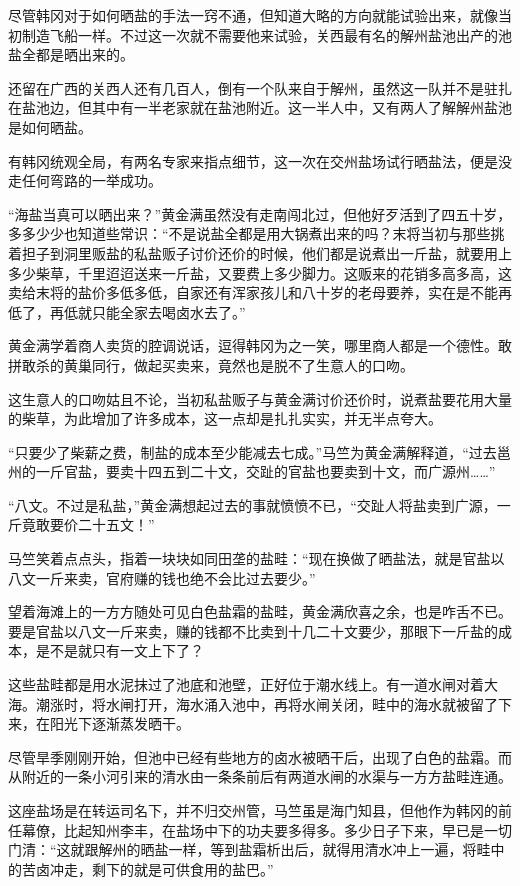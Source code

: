 尽管韩冈对于如何晒盐的手法一窍不通，但知道大略的方向就能试验出来，就像当初制造飞船一样。不过这一次就不需要他来试验，关西最有名的解州盐池出产的池盐全都是晒出来的。

还留在广西的关西人还有几百人，倒有一个队来自于解州，虽然这一队并不是驻扎在盐池边，但其中有一半老家就在盐池附近。这一半人中，又有两人了解解州盐池是如何晒盐。

有韩冈统观全局，有两名专家来指点细节，这一次在交州盐场试行晒盐法，便是没走任何弯路的一举成功。

“海盐当真可以晒出来？”黄金满虽然没有走南闯北过，但他好歹活到了四五十岁，多多少少也知道些常识：“不是说盐全都是用大锅煮出来的吗？末将当初与那些挑着担子到洞里贩盐的私盐贩子讨价还价的时候，他们都是说煮出一斤盐，就要用上多少柴草，千里迢迢送来一斤盐，又要费上多少脚力。这贩来的花销多高多高，这卖给末将的盐价多低多低，自家还有浑家孩儿和八十岁的老母要养，实在是不能再低了，再低就只能全家去喝卤水去了。”

黄金满学着商人卖货的腔调说话，逗得韩冈为之一笑，哪里商人都是一个德性。敢拼敢杀的黄巢同行，做起买卖来，竟然也是脱不了生意人的口吻。

这生意人的口吻姑且不论，当初私盐贩子与黄金满讨价还价时，说煮盐要花用大量的柴草，为此增加了许多成本，这一点却是扎扎实实，并无半点夸大。

“只要少了柴薪之费，制盐的成本至少能减去七成。”马竺为黄金满解释道，“过去邕州的一斤官盐，要卖十四五到二十文，交趾的官盐也要卖到十文，而广源州……”

“八文。不过是私盐，”黄金满想起过去的事就愤愤不已，“交趾人将盐卖到广源，一斤竟敢要价二十五文！”

马竺笑着点点头，指着一块块如同田垄的盐畦：“现在换做了晒盐法，就是官盐以八文一斤来卖，官府赚的钱也绝不会比过去要少。”

望着海滩上的一方方随处可见白色盐霜的盐畦，黄金满欣喜之余，也是咋舌不已。要是官盐以八文一斤来卖，赚的钱都不比卖到十几二十文要少，那眼下一斤盐的成本，是不是就只有一文上下了？

这些盐畦都是用水泥抹过了池底和池壁，正好位于潮水线上。有一道水闸对着大海。潮涨时，将水闸打开，海水涌入池中，再将水闸关闭，畦中的海水就被留了下来，在阳光下逐渐蒸发晒干。

尽管旱季刚刚开始，但池中已经有些地方的卤水被晒干后，出现了白色的盐霜。而从附近的一条小河引来的清水由一条条前后有两道水闸的水渠与一方方盐畦连通。

这座盐场是在转运司名下，并不归交州管，马竺虽是海门知县，但他作为韩冈的前任幕僚，比起知州李丰，在盐场中下的功夫要多得多。多少日子下来，早已是一切门清：“这就跟解州的晒盐一样，等到盐霜析出后，就得用清水冲上一遍，将畦中的苦卤冲走，剩下的就是可供食用的盐巴。”

